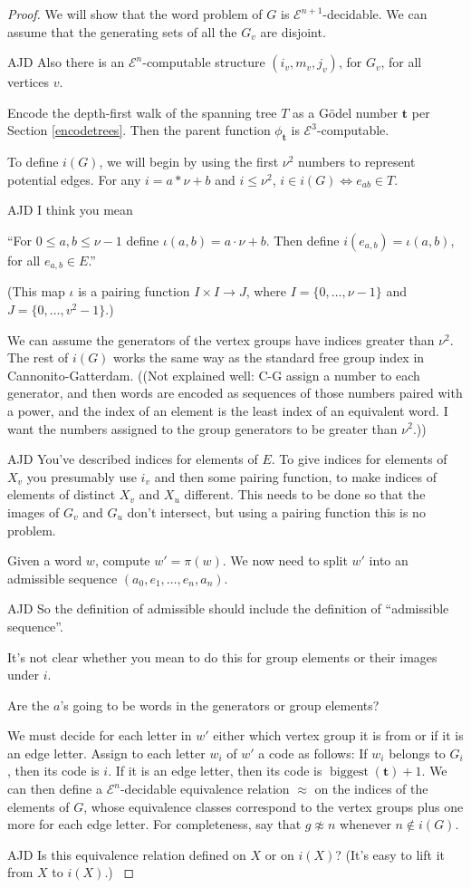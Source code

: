 \documentclass[a4paper]{article}
\newcommand{\grz}[1]{$\mathcal{E}^{#1}$}	%
\newcommand{\tvec}{\mathbf{t}}	%
\theoremstyle{plain}
\theoremstyle{definition}
\newenvironment{ad}{\noindent\color{green} AJD }{}
\newcommand{\ajd}[1]{
\begin{ad} #1 \end{ad}}
\begin{document}
\begin{proof}
We will show that the word problem of $G$ is \grz{n+1}-decidable. We can assume that the generating sets of all the $G_v$ are disjoint.

\ajd{Also there is an \grz{n}-computable structure $(i_v,m_v,j_v)$, for 
$G_v$, for all vertices $v$. }

Encode the depth-first walk of the spanning tree $T$ as a G\"odel number $\tvec$ per Section \ref{encodetrees}. Then the parent function $\phi_{\tvec}$ is \grz{3}-computable. 

To define $i(G)$, we will begin by using the first $\nu^2$ numbers to represent potential edges. For any $i=a*\nu+b$ and $i \leq \nu^2$, $i \in i(G) \Leftrightarrow e_{ab} \in T$.
\ajd{I think you mean 

``For $0\le a,b\le \nu-1$ define $\iota(a,b)=a\cdot \nu +b$. Then 
define $i(e_{a,b})=\iota(a,b)$, for all $e_{a,b}\in E$.''

(This map $\iota$ is a pairing function $I\times I \rightarrow J$, where
$I=\{0, \ldots, \nu-1\}$ and $J=\{0,\ldots, v^2-1\}$.) 
}

We can assume the generators of the vertex groups have indices greater than $\nu^2$. The rest of $i(G)$ works the same way as the standard free group index in Cannonito-Gatterdam.	((Not explained well: C-G assign a number to each generator, and then words are encoded as sequences of those numbers paired with a power, and the index of an element is the least index of an equivalent word. I want the numbers assigned to the group generators to be greater than $\nu^2$.))
\ajd{You've described indices for elements of $E$. To give indices for 
elements of $X_v$ you presumably use $i_v$ and then some pairing function,
to make indices of elements of distinct $X_v$ and $X_u$ different. This
needs to be done so that the images of $G_v$ and $G_u$ don't
intersect, but using a pairing function this is no problem.}

Given a word $w$, compute $w' = \pi(w)$. We now need to split $w'$ into an admissible sequence $(a_0,e_1,\dots,e_n,a_n)$. 
\ajd{So the definition of admissible should include the definition of
``admissible sequence''.

It's not clear whether you mean to do this for group elements or 
their images under $i$. 

Are the $a$'s going to be words in the generators or group elements?}

We must decide for each letter in $w'$ either which vertex group it is from or if it is an edge letter. Assign to each letter $w_i$ of $w'$ a code as follows: If $w_i$ belongs to $G_i$, then its code is $i$. If it is an edge letter, then its code is $\operatorname{biggest}(\tvec)+1$. We can then define a \grz{n}-decidable equivalence relation $\approx$ on the indices of the elements of $G$, whose equivalence classes correspond to the vertex groups plus one more for each edge letter. For completeness, say that $g \not \approx n$ whenever $n \notin i(G)$.
\ajd{Is this equivalence relation defined on $X$ or on $i(X)$? (It's easy
to lift it from $X$ to $i(X)$.)}


\end{proof}
\end{document}
